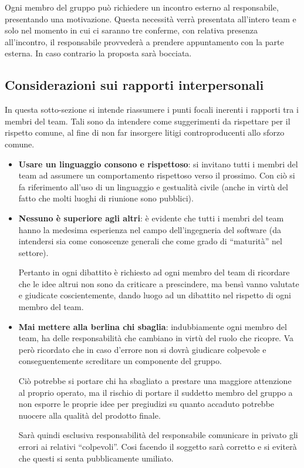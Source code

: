Ogni membro del gruppo può richiedere un incontro esterno al responsabile, presentando una motivazione. Questa necessità verrà presentata all'intero team e solo nel momento in cui ci saranno tre conferme, con relativa presenza all'incontro, il responsabile provvederà a prendere appuntamento con la parte esterna. In caso contrario la proposta sarà bocciata.

\subsection{Considerazioni sui rapporti interpersonali}

In questa sotto-sezione si intende riassumere i punti focali inerenti i rapporti tra i membri del team. Tali sono da intendere come suggerimenti da rispettare per il rispetto comune, al fine di non far insorgere litigi controproducenti allo sforzo comune.

\begin{itemize}
	\item \textbf{Usare un linguaggio consono e rispettoso}: si invitano tutti i membri del team ad assumere un comportamento rispettoso verso il prossimo. Con ciò si fa riferimento all'uso di un linguaggio e gestualità civile (anche in virtù del fatto che molti luoghi di riunione sono pubblici).
	\item \textbf{Nessuno è superiore agli altri}: è evidente che tutti i membri del team hanno la medesima esperienza nel campo dell'ingegneria del software (da intendersi sia come conoscenze generali che come grado di ``maturità'' nel settore).
	
Pertanto in ogni dibattito  è richiesto ad ogni membro del team di ricordare che le idee altrui non sono da criticare a prescindere, ma bensì vanno valutate e giudicate coscientemente, dando luogo ad un dibattito nel rispetto di ogni membro del team.
	\item \textbf{Mai mettere alla berlina chi sbaglia}: indubbiamente ogni membro del team, ha delle responsabilità che cambiano in virtù del ruolo che ricopre. Va però ricordato che in caso d'errore non si dovrà giudicare colpevole e conseguentemente screditare un componente del gruppo.
	
Ciò potrebbe si portare chi ha sbagliato a prestare una maggiore attenzione al proprio operato, ma il rischio di  portare il suddetto membro del gruppo a non esporre le proprie idee per pregiudizi su quanto accaduto potrebbe nuocere alla qualità del prodotto finale.

Sarà quindi esclusiva responsabilità del responsabile comunicare in privato gli errori ai relativi ``colpevoli''. Cosi facendo il soggetto sarà corretto e si eviterà che questi si senta pubblicamente umiliato.
\end{itemize}

